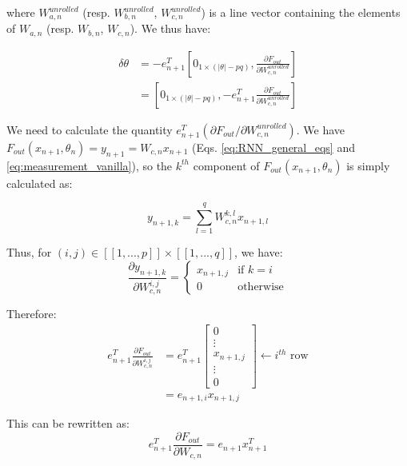 \documentclass[twocolumn,a4paper]{svjour3} \sloppy          \smartqed
\begin{document}
where $W_{a,n}^{unrolled}$ (resp. $W_{b,n}^{unrolled}$, $W_{c,n}^{unrolled}$) is a line vector containing the elements of $W_{a,n}$ (resp. $W_{b,n}$, $W_{c,n}$). We thus have:

\begin{align}
\delta \theta &= - e_{n+1}^T \left[ 0_{1 \times (|\theta|-pq)}, \frac{\partial F_{out}}{\partial W_{c,n}^{unrolled}} \right] \\
&= \left[ 0_{1 \times (|\theta|-pq)}, - e_{n+1}^T \frac{\partial F_{out}}{\partial W_{c,n}^{unrolled}} \right] \label{eq: delta theta aux}
\end{align}

We need to calculate the quantity $e_{n+1}^T (\partial F_{out} / \partial W_{c,n}^{unrolled})$. We have $F_{out}(x_{n+1}, \theta_n) = y_{n+1} = W_{c,n} x_{n+1}$ (Eqs. \ref{eq:RNN_general_eqs} and \ref{eq:measurement_vanilla}), so the $k^{th}$ component of $F_{out}(x_{n+1}, \theta_n)$ is simply calculated as:

\begin{equation}
y_{n+1,k} = \sum_{l=1}^q W_{c,n}^{k,l} x_{n+1,l}
\end{equation}

Thus, for $(i,j) \in [\![ 1, ..., p ]\!] \times [\![ 1, ..., q ]\!]$, we have:
\begin{equation} \label{eq:delta theta calculation aux 1}     
	\frac{\partial y_{n+1,k}}{\partial W_{c,n}^{i,j}} = 
    \begin{cases}
      x_{n+1,j} & \text{if $k=i$}\\
      0 & \text{otherwise}
    \end{cases} 
\end{equation} 

Therefore:
\begin{align}
e_{n+1}^T \frac{\partial F_{out}}{\partial W_{c,n}^{i,j}} &= e_{n+1}^T  \begin{bmatrix} 
0 \\
\vdots \\
x_{n+1,j} \\
\vdots \\
0
\end{bmatrix}
\leftarrow i^{th} \mbox{ row} \\
&= e_{n+1, i} x_{n+1,j}
\end{align}

This can be rewritten as:
\begin{equation}
e_{n+1}^T \frac{\partial F_{out}}{\partial W_{c,n}} = e_{n+1} x_{n+1}^T 
\end{equation}
\end{document}

